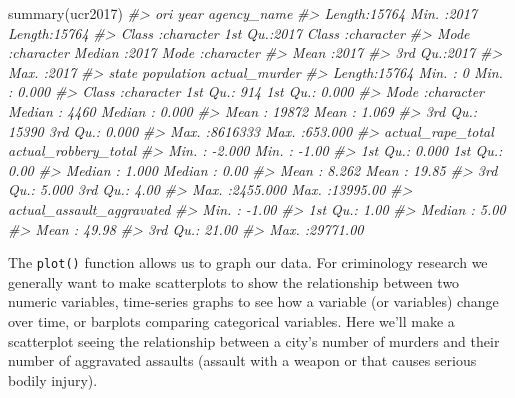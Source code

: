 \documentclass[
]{krantz}
\makeatletter
\newenvironment{Shaded}{\begin{snugshade}}{\end{snugshade}}
\newcommand{\CommentTok}[1]{\textcolor[rgb]{0.37,0.37,0.37}{\textit{#1}}}
\newcommand{\FunctionTok}[1]{\textcolor[rgb]{0,0,0}{#1}}
\newcommand{\NormalTok}[1]{#1}
\newenvironment{kframe}{%
\medskip{}
\setlength{\fboxsep}{.8em}
 \def\at@end@of@kframe{}%
 \ifinner\ifhmode%
  \def\at@end@of@kframe{\end{minipage}}%
  \begin{minipage}{\columnwidth}%
 \fi\fi%
 \def\FrameCommand##1{\hskip\@totalleftmargin \hskip-\fboxsep
 \colorbox{shadecolor}{##1}\hskip-\fboxsep
     \hskip-\linewidth \hskip-\@totalleftmargin \hskip\columnwidth}%
 \MakeFramed {\advance\hsize-\width
   \@totalleftmargin\z@ \linewidth\hsize
   \@setminipage}}%
 {\par\unskip\endMakeFramed%
 \at@end@of@kframe}
\renewenvironment{Shaded}{\begin{kframe}}{\end{kframe}}
\makeatother
\begin{document}
\begin{Shaded}
\begin{Highlighting}[]
\FunctionTok{summary}\NormalTok{(ucr2017)}
\CommentTok{\#\textgreater{}      ori                 year      agency\_name       }
\CommentTok{\#\textgreater{}  Length:15764       Min.   :2017   Length:15764      }
\CommentTok{\#\textgreater{}  Class :character   1st Qu.:2017   Class :character  }
\CommentTok{\#\textgreater{}  Mode  :character   Median :2017   Mode  :character  }
\CommentTok{\#\textgreater{}                     Mean   :2017                     }
\CommentTok{\#\textgreater{}                     3rd Qu.:2017                     }
\CommentTok{\#\textgreater{}                     Max.   :2017                     }
\CommentTok{\#\textgreater{}     state             population      actual\_murder    }
\CommentTok{\#\textgreater{}  Length:15764       Min.   :      0   Min.   :  0.000  }
\CommentTok{\#\textgreater{}  Class :character   1st Qu.:    914   1st Qu.:  0.000  }
\CommentTok{\#\textgreater{}  Mode  :character   Median :   4460   Median :  0.000  }
\CommentTok{\#\textgreater{}                     Mean   :  19872   Mean   :  1.069  }
\CommentTok{\#\textgreater{}                     3rd Qu.:  15390   3rd Qu.:  0.000  }
\CommentTok{\#\textgreater{}                     Max.   :8616333   Max.   :653.000  }
\CommentTok{\#\textgreater{}  actual\_rape\_total  actual\_robbery\_total}
\CommentTok{\#\textgreater{}  Min.   :  {-}2.000   Min.   :   {-}1.00    }
\CommentTok{\#\textgreater{}  1st Qu.:   0.000   1st Qu.:    0.00    }
\CommentTok{\#\textgreater{}  Median :   1.000   Median :    0.00    }
\CommentTok{\#\textgreater{}  Mean   :   8.262   Mean   :   19.85    }
\CommentTok{\#\textgreater{}  3rd Qu.:   5.000   3rd Qu.:    4.00    }
\CommentTok{\#\textgreater{}  Max.   :2455.000   Max.   :13995.00    }
\CommentTok{\#\textgreater{}  actual\_assault\_aggravated}
\CommentTok{\#\textgreater{}  Min.   :   {-}1.00         }
\CommentTok{\#\textgreater{}  1st Qu.:    1.00         }
\CommentTok{\#\textgreater{}  Median :    5.00         }
\CommentTok{\#\textgreater{}  Mean   :   49.98         }
\CommentTok{\#\textgreater{}  3rd Qu.:   21.00         }
\CommentTok{\#\textgreater{}  Max.   :29771.00}
\end{Highlighting}
\end{Shaded}

The \texttt{plot()} function allows us to graph our data. For criminology research we generally want to make scatterplots to show the relationship between two numeric variables, time-series graphs to see how a variable (or variables) change over time, or barplots comparing categorical variables. Here we'll make a scatterplot seeing the relationship between a city's number of murders and their number of aggravated assaults (assault with a weapon or that causes serious bodily injury).
\end{document}
